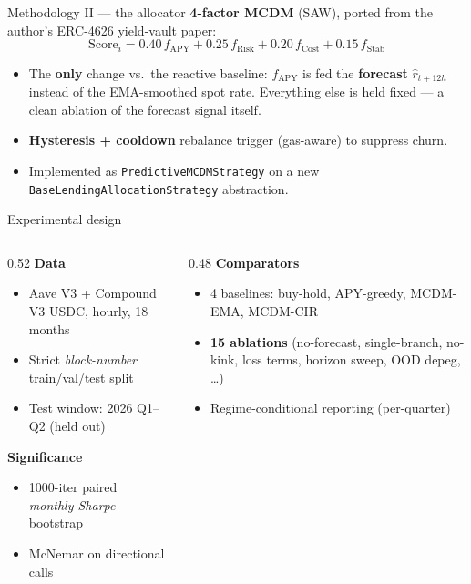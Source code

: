 \documentclass[aspectratio=169,11pt]{beamer}
\begin{document}
\begin{frame}{Methodology II --- the allocator}
  \textbf{4-factor MCDM} (SAW), ported from the author's ERC-4626 yield-vault
  paper:
  \[
    \text{Score}_i = 0.40\,f_{\text{APY}} + 0.25\,f_{\text{Risk}}
                    + 0.20\,f_{\text{Cost}} + 0.15\,f_{\text{Stab}}
  \]
  \begin{itemize}
    \item The \textbf{only} change vs.\ the reactive baseline: $f_{\text{APY}}$
          is fed the \textbf{forecast} $\hat r_{t+12h}$ instead of the
          EMA-smoothed spot rate. Everything else is held fixed --- a clean
          ablation of the forecast signal itself.
    \item \textbf{Hysteresis + cooldown} rebalance trigger (gas-aware) to
          suppress churn.
    \item Implemented as \texttt{PredictiveMCDMStrategy} on a new
          \texttt{BaseLendingAllocationStrategy} abstraction.
  \end{itemize}
\end{frame}

\begin{frame}{Experimental design}
  \begin{columns}[T]
    \begin{column}{0.52\textwidth}
      \textbf{Data}
      \begin{itemize}
        \item Aave V3 + Compound V3 USDC, hourly, 18 months
        \item Strict \emph{block-number} train/val/test split
        \item Test window: 2026 Q1--Q2 (held out)
      \end{itemize}
      \medskip
      \textbf{Significance}
      \begin{itemize}
        \item 1000-iter paired \emph{monthly-Sharpe} bootstrap
        \item McNemar on directional calls
      \end{itemize}
    \end{column}
    \begin{column}{0.48\textwidth}
      \textbf{Comparators}
      \begin{itemize}
        \item 4 baselines: buy-hold, APY-greedy, MCDM-EMA, MCDM-CIR
        \item \textbf{15 ablations} (no-forecast, single-branch,
              no-kink, loss terms, horizon sweep, OOD depeg, \dots)
        \item Regime-conditional reporting (per-quarter)
      \end{itemize}
    \end{column}
  \end{columns}
\end{frame}
\end{document}
